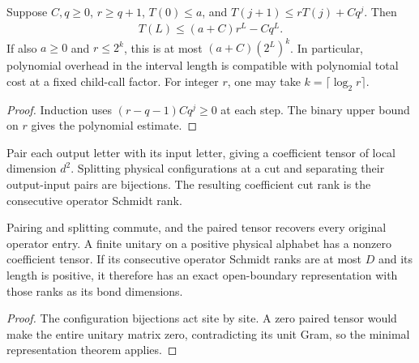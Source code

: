 \begin{lemma}
    \label{thm:mpu_polynomial_overhead_recursion}
    \leanok
    Suppose $C,q\geq0$, $r\geq q+1$, $T(0)\leq a$, and
    $T(j+1)\leq rT(j)+Cq^j$. Then
    \begin{align}
        T(L)\leq(a+C)r^L-Cq^L.
    \end{align}
    If also $a\geq0$ and $r\leq2^k$, this is at most
    $(a+C)(2^L)^k$. In particular, polynomial overhead in the
    interval length is compatible with polynomial total cost
    at a fixed child-call factor. For integer $r$, one may take
    $k=\lceil\log_2 r\rceil$.
\end{lemma}
\begin{proof}\leanok
    Induction uses $(r-q-1)Cq^j\geq0$ at each step.
    The binary upper bound on $r$ gives the polynomial estimate.
\end{proof}

\begin{definition}
    \label{def:mpu_paired_operator_coefficients}
    \leanok
    Pair each output letter with its input letter, giving a coefficient
    tensor of local dimension $d^2$. Splitting physical configurations
    at a cut and separating their output-input pairs are bijections.
    The resulting coefficient cut rank is the consecutive operator
    Schmidt rank.
\end{definition}

\begin{lemma}
    \label{thm:mpu_minimal_physical_unitary_cuts}
    \leanok
    Pairing and splitting commute, and the paired tensor recovers
    every original operator entry. A finite unitary on a positive
    physical alphabet has a nonzero coefficient tensor. If its
    consecutive operator Schmidt ranks are at most $D$ and its
    length is positive, it therefore has an exact open-boundary
    representation with those ranks as its bond dimensions.
\end{lemma}
\begin{proof}\leanok
    The configuration bijections act site by site. A zero paired
    tensor would make the entire unitary matrix zero, contradicting
    its unit Gram, so the minimal representation theorem applies.
\end{proof}

